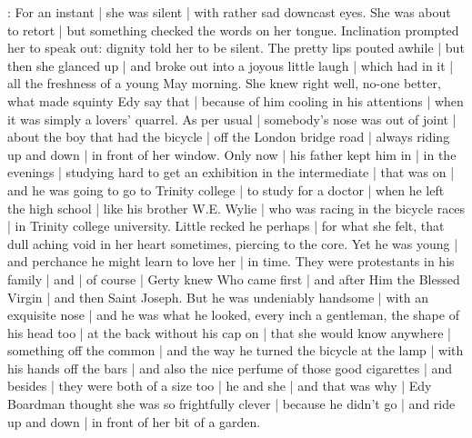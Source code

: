 :
For an instant |
she was silent |
with rather sad downcast eyes.
She was about to retort |
but something checked the words on her tongue.
Inclination prompted her to speak out:
dignity told her to be silent.
The pretty lips pouted awhile |
but then she glanced up |
and broke out into a joyous little laugh |
which had in it |
all the freshness
of a young May morning.
She knew right well,
no-one better,
what made squinty Edy say that |
because of him cooling in his attentions |
when it was simply a lovers' quarrel.
As per usual |
somebody's nose was out of joint |%
about the boy that had the bicycle |
off the London bridge road |
always riding up and down |
in front of her window.
Only now |
his father kept him in |
in the evenings |
studying hard to get an exhibition in the intermediate |
that was on |
and he was going to go to Trinity college |
to study for a doctor |
when he left the high school |
like his brother W.E. Wylie |
who was racing in the bicycle races |
in Trinity college university.
Little recked he perhaps |
for what she felt,
that dull aching void in her heart sometimes,
piercing to the core.
Yet he was young |
and perchance he might learn to love her |
in time.
They were protestants in his family |
and |
of course |
Gerty knew Who came first |
and after Him the Blessed Virgin |
and then Saint Joseph.%
But he was undeniably handsome |
with an exquisite nose |
and he was what he looked,
every inch a gentleman,
the shape of his head too |
at the back without his cap on |
that she would know anywhere |
something off the common |
and the way he turned the bicycle at the lamp |
with his hands off the bars |
and also the nice perfume of those good cigarettes |
and besides |
they were both of a size too |
he and she |
and that was why |
Edy Boardman thought she was so frightfully clever |
because he didn't go |
and ride up and down |
in front of her bit of a garden.

